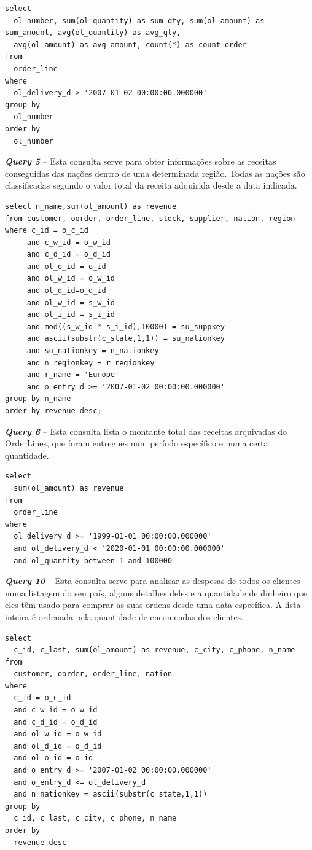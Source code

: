 \begin{verbatim}
select
  ol_number, sum(ol_quantity) as sum_qty, sum(ol_amount) as sum_amount, avg(ol_quantity) as avg_qty,
  avg(ol_amount) as avg_amount, count(*) as count_order
from
  order_line
where
  ol_delivery_d > '2007-01-02 00:00:00.000000'
group by
  ol_number
order by
  ol_number
\end{verbatim}


\textbf{\textit{Query 5}} – Esta consulta serve para obter informações sobre as receitas conseguidas das nações dentro de uma determinada região. Todas as nações são classificadas segundo o valor total da receita adquirida desde a data indicada.

\begin{verbatim}
select n_name,sum(ol_amount) as revenue
from customer, oorder, order_line, stock, supplier, nation, region
where c_id = o_c_id
     and c_w_id = o_w_id
     and c_d_id = o_d_id
     and ol_o_id = o_id
     and ol_w_id = o_w_id
     and ol_d_id=o_d_id
     and ol_w_id = s_w_id
     and ol_i_id = s_i_id
     and mod((s_w_id * s_i_id),10000) = su_suppkey
     and ascii(substr(c_state,1,1)) = su_nationkey
     and su_nationkey = n_nationkey
     and n_regionkey = r_regionkey
     and r_name = 'Europe'
     and o_entry_d >= '2007-01-02 00:00:00.000000'
group by n_name
order by revenue desc;
\end{verbatim}


\textbf{\textit{Query 6}} – Esta consulta lista o montante total das receitas arquivadas do OrderLines, que foram entregues num período específico e numa certa quantidade.

\begin{verbatim}
select
  sum(ol_amount) as revenue
from
  order_line
where
  ol_delivery_d >= '1999-01-01 00:00:00.000000'
  and ol_delivery_d < '2020-01-01 00:00:00.000000'
  and ol_quantity between 1 and 100000
\end{verbatim}

\textbf{\textit{Query 10}} – Esta consulta serve para analisar as despesas de todos os clientes numa listagem do seu país, alguns detalhes deles e a quantidade de dinheiro que eles têm usado para comprar as suas ordens desde uma data específica. A lista inteira é ordenada pela quantidade de encomendas dos clientes.

\begin{verbatim}
select
  c_id, c_last, sum(ol_amount) as revenue, c_city, c_phone, n_name
from
  customer, oorder, order_line, nation
where
  c_id = o_c_id
  and c_w_id = o_w_id
  and c_d_id = o_d_id
  and ol_w_id = o_w_id
  and ol_d_id = o_d_id
  and ol_o_id = o_id
  and o_entry_d >= '2007-01-02 00:00:00.000000'
  and o_entry_d <= ol_delivery_d
  and n_nationkey = ascii(substr(c_state,1,1))
group by
  c_id, c_last, c_city, c_phone, n_name
order by
  revenue desc
\end{verbatim}


